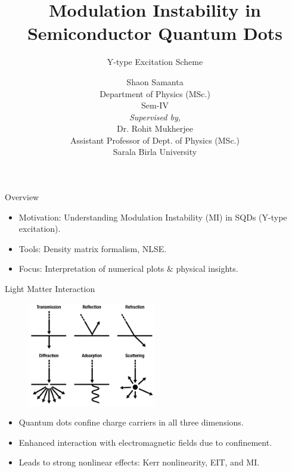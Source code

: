 \documentclass[12pt,aspectratio=1610]{beamer}
\title{Modulation Instability in Semiconductor Quantum Dots}
\subtitle{Y-type Excitation Scheme}
\author{Shaon Samanta\\
        Department of Physics (MSc.)\\
        Sem-IV\\[1.2em]
        \textit{Supervised by,}\\
        Dr. Rohit Mukherjee\\
        Assistant Professor of Dept. of Physics (MSc.)\\
        Sarala Birla University}
\date{}
\begin{document}
\frame{\titlepage}

\begin{frame}{Overview}
  \vspace{-3pt}
  \begin{itemize}
    \item Motivation: Understanding Modulation Instability (MI) in SQDs (Y-type excitation).
    \item Tools: Density matrix formalism, NLSE\@.
    \item Focus: Interpretation of numerical plots \& physical insights.
  \end{itemize}
\end{frame}

\begin{frame}{Light Matter Interaction}
  \vspace{-20pt}
  \hspace*{55pt}
  \begin{figure}
    \includegraphics[width=0.5\textwidth]{Assets/Light Matter Interaction.jpeg}
  \end{figure}
  \begin{itemize}
    \item Quantum dots confine charge carriers in all three dimensions.
    \item Enhanced interaction with electromagnetic fields due to confinement.
    \item Leads to strong nonlinear effects: Kerr nonlinearity, EIT, and MI\@.
  \end{itemize}
\end{frame}
\end{document}
